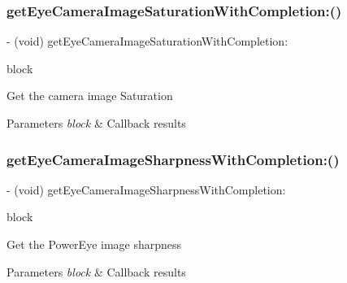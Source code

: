 \subsubsection{\texorpdfstring{get\+Eye\+Camera\+Image\+Saturation\+With\+Completion\+:()}{getEyeCameraImageSaturationWithCompletion:()}}
{\footnotesize\ttfamily -\/ (void) get\+Eye\+Camera\+Image\+Saturation\+With\+Completion\+: \begin{DoxyParamCaption}\item[{(void($^\wedge$)(N\+S\+Integer saturation, N\+S\+Error $\ast$\+\_\+\+Nullable error))}]{block }\end{DoxyParamCaption}}

Get the camera image Saturation


\begin{DoxyParams}{Parameters}
{\em block} & Callback results \\
\hline
\end{DoxyParams}
\mbox{\label{interface_p_v_eye_camera_a8ac94cc19ba52ef5ea46ddc8aa49f538}} 
\subsubsection{\texorpdfstring{get\+Eye\+Camera\+Image\+Sharpness\+With\+Completion\+:()}{getEyeCameraImageSharpnessWithCompletion:()}}
{\footnotesize\ttfamily -\/ (void) get\+Eye\+Camera\+Image\+Sharpness\+With\+Completion\+: \begin{DoxyParamCaption}\item[{(void($^\wedge$)(N\+S\+Integer sharpness, N\+S\+Error $\ast$\+\_\+\+Nullable error))}]{block }\end{DoxyParamCaption}}

Get the Power\+Eye image sharpness


\begin{DoxyParams}{Parameters}
{\em block} & Callback results \\
\hline
\end{DoxyParams}
\mbox{\label{interface_p_v_eye_camera_a93336d0dd5b9899dd4e813df2771ebf6}} 
